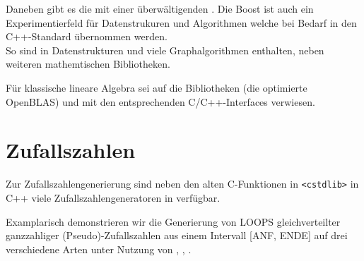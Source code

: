 Daneben gibt es die 
mit einer überwältigenden .
Die Boost ist auch ein Experimentierfeld für Datenstrukuren und Algorithmen welche bei Bedarf in den C++-Standard übernommen werden. 
\\
So sind in  Datenstrukturen und viele 
Graphalgorithmen enthalten, neben weiteren mathemtischen Bibliotheken.

Für klassische lineare Algebra sei auf die Bibliotheken 
 (die optimierte OpenBLAS) und 
 mit den entsprechenden C/C++-Interfaces verwiesen.

%
%
\section{Zufallszahlen}
\label{sec:13.7}
Zur Zufallszahlengenerierung sind neben den alten C-Funktionen in \verb|<cstdlib>| in C++ 
viele Zufallszahlengeneratoren in   verfügbar.

Examplarisch demonstrieren wir die Generierung von LOOPS gleichverteilter ganzzahliger (Pseudo)-Zufallszahlen 
aus einem Intervall [ANF, ENDE] auf drei verschiedene Arten unter Nutzung von  
,
, 
.



 
